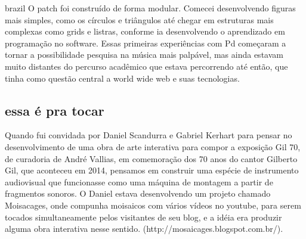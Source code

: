 \begin{otherlanguage*}{brazil}
O patch foi construído de forma modular. Comecei desenvolvendo figuras mais simples, como os círculos e triângulos até chegar em estruturas mais complexas como grids e listras, conforme ia desenvolvendo o aprendizado em programação no software. Essas primeiras experiências com Pd começaram a tornar a possibilidade pesquisa na música mais palpável, mas ainda estavam muito distantes do percurso acadêmico que estava percorrendo até então, que tinha como questão central a world wide web e suas tecnologias.

\subsection{essa é pra tocar}
Quando fui convidada por Daniel Scandurra e Gabriel Kerhart para pensar no desenvolvimento de uma obra de arte interativa para compor a exposição Gil 70, de curadoria de André Vallias, em comemoração dos 70 anos do cantor Gilberto Gil, que aconteceu em 2014, pensamos em construir uma espécie de instrumento audiovisual que funcionasse como uma máquina de montagem a partir de fragmentos sonoros. O Daniel estava desenvolvendo um projeto chamado Moisacages, onde compunha moisaicos com vários vídeos no youtube, para serem tocados simultaneamente pelos visitantes de seu blog, e a idéia era produzir alguma obra interativa nesse sentido. (http://mosaicages.blogspot.com.br/). 


\end{otherlanguage*}
